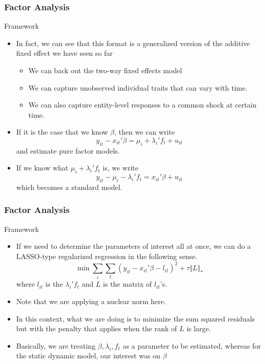 \documentclass{beamer}
\begin{document}
\begin{frame}
\frametitle{Factor Analysis}
Framework
\begin{itemize}
\item In fact, we can see that this format is a generalized version of the additive fixed effect we have seen so far
\begin{itemize}
\item We can back out the two-way fixed effects model 
\item We can capture unobserved individual traits that can vary with time. 
\item We can also capture entity-level responses to a common shock at certain time.
\end{itemize}
\item If it is the case that we know $\beta$, then we can write
\[
y_{it}-x_{it}'\beta = \mu_i+\lambda_i'f_t + u_{it}
\]
and estimate pure factor models. 
\item If we know what $\mu_i + \lambda_i'f_t$ is, we write
\[
y_{it}-\mu_i-\lambda_i'f_t = x_{it}'\beta+u_{it}
\]
which becomes a standard model.
\end{itemize}
\end{frame}

\begin{frame}
\frametitle{Factor Analysis}
Framework
\begin{itemize}
\item If we need to determine the parameters of interest all at once, we can do a LASSO-type regularized regression in the following sense. 
\[
\min \sum_i \sum_t (y_{it}-x_{it}'\beta-l_{it})^2 + \tau\Vert L \Vert_*
\]
where $l_{it}$ is the $\lambda_i'f_t$ and $L$ is the matrix of $l_{it}$'s.
\item Note that we are applying a nuclear norm here. 
\item In this context, what we are doing is to minimize the sum squared residuals but with the penalty that applies when the rank of $L$ is large. 
\item Basically, we are treating $\beta, \lambda_i, f_t$ as a parameter to be estimated, whereas for the static dynamic model, our interest was on $\beta$\end{itemize}
\end{frame}
\end{document}
